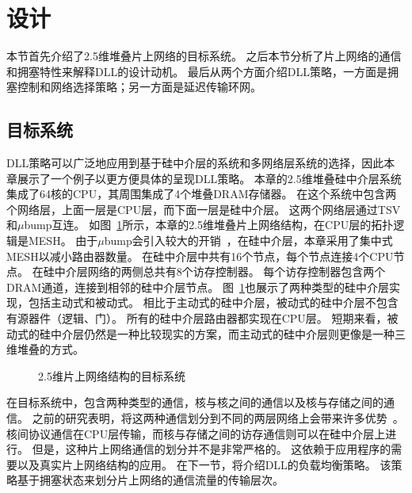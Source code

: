 \section{设计}
\label{sec:dlldesign}

本节首先介绍了2.5维堆叠片上网络的目标系统。
之后本节分析了片上网络的通信和拥塞特性来解释DLL的设计动机。
最后从两个方面介绍DLL策略，一方面是拥塞控制和网络选择策略；另一方面是延迟传输环网。

\subsection{目标系统}
\label{sec:dlltarget}

DLL策略可以广泛地应用到基于硅中介层的系统和多网络层系统的选择，因此本章展示了一个例子以更方便具体的呈现DLL策略。
本章的2.5维堆叠硅中介层系统集成了64核的CPU，其周围集成了4个堆叠DRAM存储器。
在这个系统中包含两个网络层，上面一层是CPU层，而下面一层是硅中介层。
这两个网络层通过TSV和$\mu$bump互连。
如图~\ref{fig:target_system}所示，本章的2.5维堆叠片上网络结构，在CPU层的拓扑逻辑是MESH。
由于$\mu$bump会引入较大的开销~，在硅中介层，本章采用了集中式MESH以减小路由器数量。
在硅中介层中共有16个节点，每个节点连接4个CPU节点。
在硅中介层网络的两侧总共有8个访存控制器。
每个访存控制器包含两个DRAM通道，连接到相邻的硅中介层节点。
图~\ref{fig:target_system}也展示了两种类型的硅中介层实现，包括主动式和被动式。
相比于主动式的硅中介层，被动式的硅中介层不包含有源器件（逻辑、门）。
所有的硅中介层路由器都实现在CPU层。
短期来看，被动式的硅中介层仍然是一种比较现实的方案，而主动式的硅中介层则更像是一种三维堆叠的方式。

\begin{figure}[htb]
\centering
{} \qquad
{} \qquad
{}  
\caption{2.5维片上网络结构的目标系统}
\label{fig:target_system}
\end{figure}

在目标系统中，包含两种类型的通信，核与核之间的通信以及核与存储之间的通信。
之前的研究表明，将这两种通信划分到不同的两层网络上会带来许多优势~。
核间协议通信在CPU层传输，而核与存储之间的访存通信则可以在硅中介层上进行。
但是，这种片上网络通信的划分并不是非常严格的。
这依赖于应用程序的需要以及真实片上网络结构的应用。
在下一节，将介绍DLL的负载均衡策略。
该策略基于拥塞状态来划分片上网络的通信流量的传输层次。


